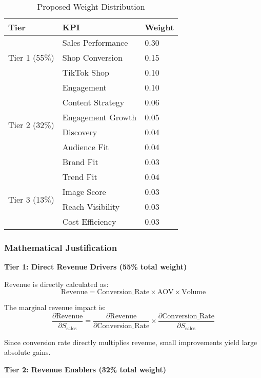 \documentclass[12pt,a4paper]{article}
\begin{document}
\begin{table}[h]
\centering
\begin{tabular}{@{}lll@{}}
\toprule
\textbf{Tier} & \textbf{KPI} & \textbf{Weight} \\
\midrule
\multirow{3}{*}{Tier 1 (55\%)} & Sales Performance & 0.30 \\
& Shop Conversion & 0.15 \\
& TikTok Shop & 0.10 \\
\midrule
\multirow{6}{*}{Tier 2 (32\%)} & Engagement & 0.10 \\
& Content Strategy & 0.06 \\
& Engagement Growth & 0.05 \\
& Discovery & 0.04 \\
& Audience Fit & 0.04 \\
& Brand Fit & 0.03 \\
\midrule
\multirow{4}{*}{Tier 3 (13\%)} & Trend Fit & 0.04 \\
& Image Score & 0.03 \\
& Reach Visibility & 0.03 \\
& Cost Efficiency & 0.03 \\
\bottomrule
\end{tabular}
\caption{Proposed Weight Distribution}
\end{table}

\subsubsection{Mathematical Justification}

\textbf{Tier 1: Direct Revenue Drivers (55\% total weight)}

Revenue is directly calculated as:
\begin{equation}
\text{Revenue} = \text{Conversion\_Rate} \times \text{AOV} \times \text{Volume}
\end{equation}

The marginal revenue impact is:
\begin{equation}
\frac{\partial \text{Revenue}}{\partial S_{\text{sales}}} = \frac{\partial \text{Revenue}}{\partial \text{Conversion\_Rate}} \times \frac{\partial \text{Conversion\_Rate}}{\partial S_{\text{sales}}}
\end{equation}

Since conversion rate directly multiplies revenue, small improvements yield large absolute gains.

\textbf{Tier 2: Revenue Enablers (32\% total weight)}
\end{document}
